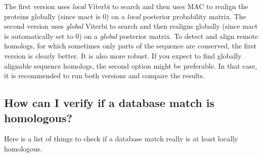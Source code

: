 \documentclass[11pt,a4paper]{article}
\begin{document}
The first version uses \emph{local} Viterbi to search and then uses MAC to realign the 
proteins globally (since mact is 0) on a \emph{local} posterior probability matrix. The 
second version uses \emph{global} Viterbi to search and then realigns globally (since mact 
is automatically set to 0) on a \emph{global} posterior matrix. To detect and align remote 
homologs, for which sometimes only parts of the sequence are conserved, the first 
version is clearly better. It is also more robust. If you expect to find globally 
alignable sequence homologs, the second option might be preferable. In that case, 
it is recommended to run both versions and compare the results. 

\subsection{How can I verify if a database match is homologous?}

Here is a list of things to check if a database match really is at least locally homologous.
 
\end{document}
